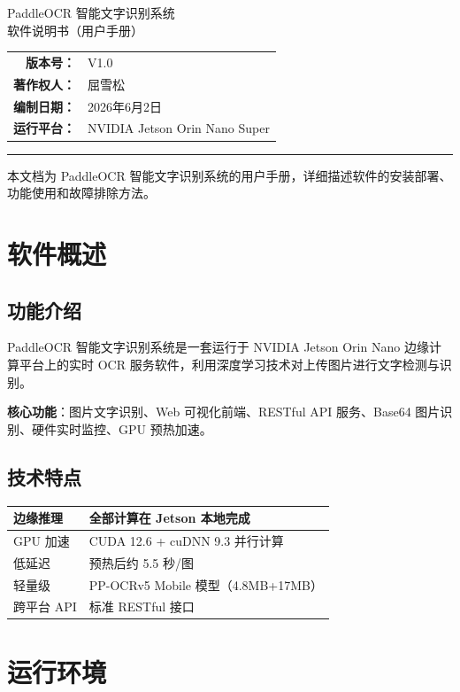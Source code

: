 \documentclass[12pt,a4paper]{ctexart}
\begin{document}
\begin{titlepage}\centering\vspace*{3cm}
{\heiti{} PaddleOCR 智能文字识别系统}\\[1cm]
{ 软件说明书（用户手册）}\\[2.5cm]
\begin{tabular}{rl}
\textbf{版本号：} & V1.0 \\ \textbf{著作权人：} & 屈雪松 \\
\textbf{编制日期：} & 2026年6月2日 \\ \textbf{运行平台：} & NVIDIA Jetson Orin Nano Super
\end{tabular}
\vfill\noindent\rule{\textwidth}{0.4pt}
{ 本文档为 PaddleOCR 智能文字识别系统的用户手册，详细描述软件的安装部署、功能使用和故障排除方法。}
\end{titlepage}

\tableofcontents\newpage

\section{软件概述}
\subsection{功能介绍}
PaddleOCR 智能文字识别系统是一套运行于 NVIDIA Jetson Orin Nano 边缘计算平台上的实时 OCR 服务软件，利用深度学习技术对上传图片进行文字检测与识别。

\textbf{核心功能}：图片文字识别、Web 可视化前端、RESTful API 服务、Base64 图片识别、硬件实时监控、GPU 预热加速。

\subsection{技术特点}
\begin{longtable}{|p{4cm}|p{10cm}|}\hline
边缘推理 & 全部计算在 Jetson 本地完成 \\\hline
GPU 加速 & CUDA 12.6 + cuDNN 9.3 并行计算 \\\hline
低延迟 & 预热后约 5.5 秒/图 \\\hline
轻量级 & PP-OCRv5 Mobile 模型（4.8MB+17MB） \\\hline
跨平台 API & 标准 RESTful 接口 \\\hline
\end{longtable}

\section{运行环境}
\end{document}
